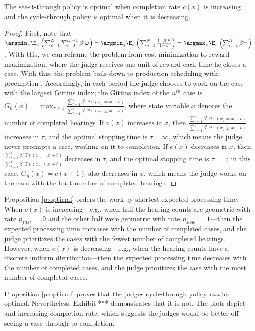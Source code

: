 	\begin{proposition}\label{p:optimal}
		The see-it-through policy is optimal when completion rate $c(x)$ is increasing and the  cycle-through policy is optimal when it is decreasing.
	\end{proposition}
	\begin{proof}
		First, note that $ \argmin_\pi \E_\pi\left (\sum_{n=1}^{N}\sum_{t=0}^{t_n-1} \beta^t\omega \right ) = \argmin_\pi \E_\pi\left (\sum_{n=1}^{N} \frac{1-\beta^{t_n}}{1-\beta}\right)=\argmax_\pi  \E_\pi\left (\sum_{n=1}^{N} \beta^{t_n}\right)$. With this, we can reframe the problem from cost minimization to reward maximization, where the judge receives one unit of reward each time he closes a case. With this, the problem boils down to production scheduling with preemption \citep[p. 275]{Pinedo2012}. Accordingly, in each period the judge chooses to work on the case with the largest Gittins index; the Gittins index of the $ n^{th} $ case is $ G_n(x)=\max_{\tau\ge 1}\frac{\sum_{t=1}^{\tau}\beta^t \Pr(x_n=x+t)}{\sum_{t=1}^{\tau}\beta^t \Pr(x_n\ge x+t)} $, where state variable $ x $ denotes the number of completed hearings. If $c(x)$ increases in $ x $, then $ \frac{\sum_{t=1}^{\tau}\beta^t \Pr(x_n=x+t)}{\sum_{t=1}^{\tau}\beta^t \Pr(x_n\ge x+t)} $ increases in $ \tau $, and the optimal stopping time is $ \tau=\infty $, which means the judge never preempts a case, working on it to completion. If $c(x)$ decreases in $ x $, then $ \frac{\sum_{t=1}^{\tau}\beta^t \Pr(x_n=x+t)}{\sum_{t=1}^{\tau}\beta^t \Pr(x_n\ge x+t)} $ decreases in $ \tau $, and the optimal stopping time is $ \tau=1 $; in this case, $ G_n(x) = c(x+1)$ also decreases in $ x $, which means the judge works on the case with the least number of completed hearings.
	\end{proof}
	
	Proposition \ref{p:optimal} orders the work by shortest expected processing time. When $ c(x) $ is increasing---e.g., when half the hearing counts are geometric with rate $ p_{fast}=.9 $ and the other half were geometric with rate $ p_{slow}=.1 $---then the expected processing time increases with the number of completed cases, and the judge prioritizes the cases with the fewest number of completed hearings. However, when $ c(x) $ is decreasing---e.g., when the hearing counts have a discrete uniform distribution---then the expected processing time decreases with the number of completed cases, and the judge prioritizes the case with the most number of completed cases.
	
	Proposition \ref{p:optimal} proves that the judges cycle-through policy \emph{can} be optimal. Nevertheless, Exhibit *** demonstrates that it is not. The plots depict and increasing completion rate, which suggests the judges would be better off seeing a case through to completion. 	
	
	\clearpage
	\singlespacing
	

